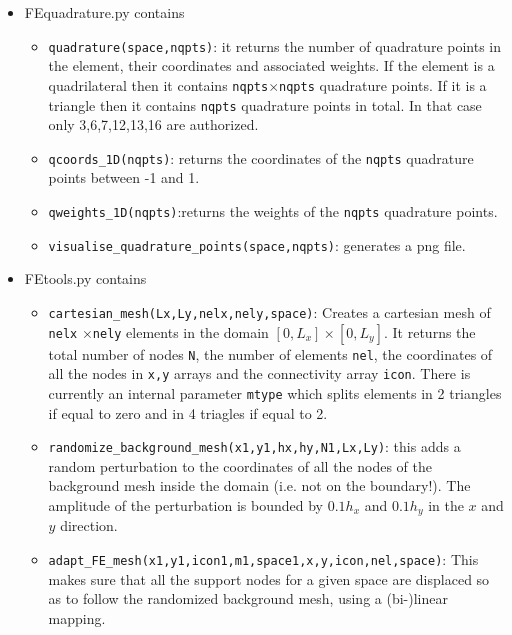 \begin{itemize}
\item {\pythonfile FEquadrature.py} contains
\begin{itemize}
\item \lstinline{quadrature(space,nqpts)}: it returns the number of quadrature points in the element, 
their coordinates and associated weights. If the element is a quadrilateral then it contains 
\lstinline{nqpts}$\times$\lstinline{nqpts} quadrature points. 
If it is a triangle then it contains \lstinline{nqpts} quadrature points in total. 
In that case only 3,6,7,12,13,16 are authorized.   
\item \lstinline{qcoords_1D(nqpts)}: returns the coordinates of the \lstinline{nqpts} quadrature points between -1 and 1.
\item \lstinline{qweights_1D(nqpts)}:returns the weights of the \lstinline{nqpts} quadrature points.
\item \lstinline{visualise_quadrature_points(space,nqpts)}: generates a png file.
\end{itemize}


\item {\pythonfile FEtools.py} contains

\begin{itemize}
\item \lstinline{cartesian_mesh(Lx,Ly,nelx,nely,space)}: Creates a cartesian mesh of \lstinline{nelx}
$\times$\lstinline{nely} elements in the domain $[0,L_x]\times[0,L_y]$. It returns the total 
number of nodes \lstinline{N}, the number of elements \lstinline{nel}, the coordinates of all the 
nodes in \lstinline{x,y} arrays and the connectivity array \lstinline{icon}.
There is currently an internal parameter \lstinline{mtype} which splits elements in 2 triangles 
if equal to zero and in 4 triagles if equal to 2.
 

\item \lstinline{randomize_background_mesh(x1,y1,hx,hy,N1,Lx,Ly)}: this adds a random perturbation
to the coordinates of all the nodes of the background mesh inside the domain (i.e. not on the boundary!). 
The amplitude of the perturbation is bounded by $0.1h_x$ and $0.1h_y$ in the $x$ and $y$ direction.

\item \lstinline{adapt_FE_mesh(x1,y1,icon1,m1,space1,x,y,icon,nel,space)}: This makes sure that 
all the support nodes for a given space are displaced so as to follow the randomized 
background mesh, using a (bi-)linear mapping.


\end{itemize}
\end{itemize}
